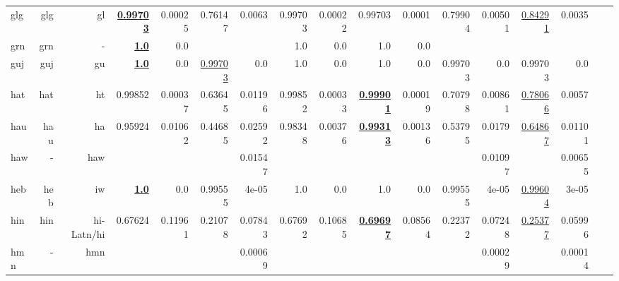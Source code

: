 \documentclass[11pt]{article}
\begin{document}
\begin{table*}[h]
{\begin{tabular}{lrrrrrrrrrrrrrrrr}
glg         & glg         & gl         & \textbf{\underline{0.99703}}         & 0.00025         & 0.76147         & 0.0063         & 0.99703         & 0.00022         & 0.99703         & 0.0001         & 0.79904         & 0.00501         & \underline{0.84291}         & 0.0035         \\
grn         & grn         & -         & \textbf{\underline{1.0}}         & 0.0         &          &          & 1.0         & 0.0         & 1.0         & 0.0         &          &          &          &          \\
guj         & guj         & gu         & \textbf{\underline{1.0}}         & 0.0         & \underline{0.99703}         & 0.0         & 1.0         & 0.0         & 1.0         & 0.0         & 0.99703         & 0.0         & 0.99703         & 0.0         \\
hat         & hat         & ht         & 0.99852         & 0.00037         & 0.63645         & 0.01196         & 0.99852         & 0.00033         & \textbf{\underline{0.99901}}         & 0.00019         & 0.70798         & 0.00861         & \underline{0.78066}         & 0.0057         \\
hau         & hau         & ha         & 0.95924         & 0.01062         & 0.44685         & 0.02592         & 0.98348         & 0.00376         & \textbf{\underline{0.99313}}         & 0.00136         & 0.53795         & 0.0179         & \underline{0.64867}         & 0.01101         \\
haw         & -         & haw         &          &          &          & 0.01547         &          &          &          &          &          & 0.01097         &          & 0.00655         \\
heb         & heb         & iw         & \textbf{\underline{1.0}}         & 0.0         & 0.99555         & 4e-05         & 1.0         & 0.0         & 1.0         & 0.0         & 0.99555         & 4e-05         & \underline{0.99604}         & 3e-05         \\
hin         & hin         & hi-Latn/hi         & 0.67624         & 0.11961         & 0.21078         & 0.07843         & 0.67692         & 0.10685         & \textbf{\underline{0.69697}}         & 0.08564         & 0.22372         & 0.07248         & \underline{0.25377}         & 0.05996         \\
hmn         & -         & hmn         &          &          &          & 0.00069         &          &          &          &          &          & 0.00029         &          & 0.00014         \\

\end{tabular}}
\end{table*}
\end{document}
